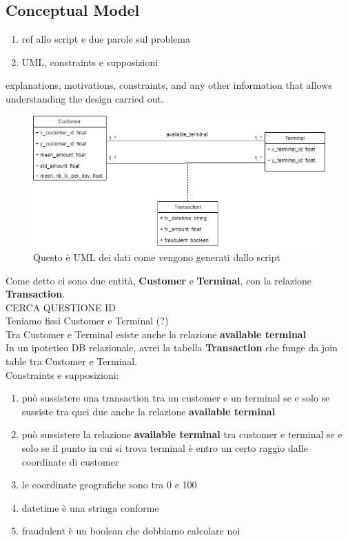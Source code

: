 \documentclass[letterpaper,11pt]{article}
\begin{document}
\subsection{Conceptual Model}
\begin{enumerate}
    \item ref allo script e due parole sul problema
    \item UML, constraints e supposizioni
\end{enumerate}
explanations, motivations, constraints, and any other information that allows understanding the design carried out.
\\
\begin{figure}[ht] 
        \centering \includegraphics[width=0.9\columnwidth]{images/FraudDetectionUML.png}
        \caption{\label{fig1}Questo è UML dei dati come vengono generati dallo script}
\end{figure}
Come detto ci sono due entità, \textbf{Customer} e \textbf{Terminal}, con la relazione \textbf{Transaction}.
\\
CERCA QUESTIONE ID
\\
Teniamo fissi Customer e Terminal (?)
\\
Tra Customer e Terminal esiste anche la relazione \textbf{available terminal}
\\
In un ipotetico DB relazionale, avrei la tabella \textbf{Transaction} che funge da join table tra Customer e Terminal.
\\
Constraints e supposizioni:
\begin{enumerate}
    \item può sussistere una transaction tra un customer e un terminal se e solo se sussiste tra quei due anche la relazione \textbf{available terminal}
    \item può sussistere la relazione \textbf{available terminal} tra customer e terminal se e solo se il punto in cui si trova terminal è entro un certo raggio dalle coordinate di customer
    \item le coordinate geografiche sono tra 0 e 100
    \item datetime è una stringa conforme
    \item fraudulent è un boolean che dobbiamo calcolare noi
\end{enumerate}
\end{document}
